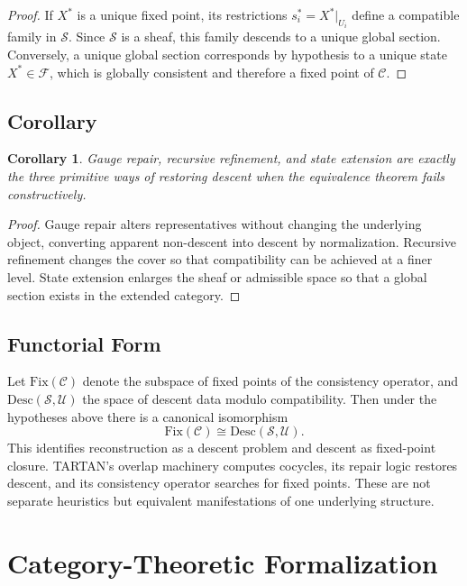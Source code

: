 \documentclass[12pt, oneside]{article}
\newtheorem{corollary}{Corollary}
\begin{document}
\begin{proof}
If $X^\ast$ is a unique fixed point, its restrictions $s_i^\ast = X^\ast|_{U_i}$ define a compatible family in $\mathcal{S}$. Since $\mathcal{S}$ is a sheaf, this family descends to a unique global section. Conversely, a unique global section corresponds by hypothesis to a unique state $X^\ast \in \mathcal{F}$, which is globally consistent and therefore a fixed point of $\mathcal{C}$.
\end{proof}

\subsection{Corollary}

\begin{corollary}
Gauge repair, recursive refinement, and state extension are exactly the three primitive ways of restoring descent when the equivalence theorem fails constructively.
\end{corollary}

\begin{proof}
Gauge repair alters representatives without changing the underlying object, converting apparent non-descent into descent by normalization. Recursive refinement changes the cover so that compatibility can be achieved at a finer level. State extension enlarges the sheaf or admissible space so that a global section exists in the extended category.
\end{proof}

\subsection{Functorial Form}

Let $\mathrm{Fix}(\mathcal{C})$ denote the subspace of fixed points of the consistency operator, and $\mathrm{Desc}(\mathcal{S},\mathcal{U})$ the space of descent data modulo compatibility. Then under the hypotheses above there is a canonical isomorphism
\[
\mathrm{Fix}(\mathcal{C}) \cong \mathrm{Desc}(\mathcal{S},\mathcal{U}).
\]
This identifies reconstruction as a descent problem and descent as fixed-point closure. TARTAN's overlap machinery computes cocycles, its repair logic restores descent, and its consistency operator searches for fixed points. These are not separate heuristics but equivalent manifestations of one underlying structure.

\section{Category-Theoretic Formalization}
\end{document}

